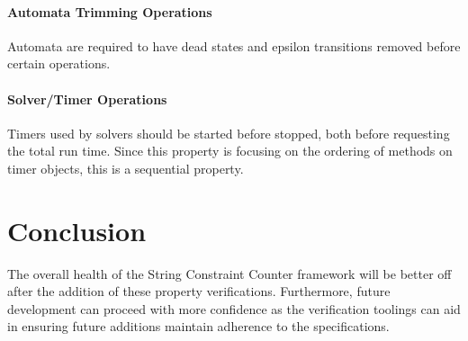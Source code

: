 \documentclass[letterpaper,11pt,twocolumn]{article}
\begin{document}
\paragraph{Automata Trimming Operations} Automata are required to have dead states and epsilon
transitions removed before certain operations.

\paragraph{Solver/Timer Operations} Timers used by solvers should be started before stopped,
both before requesting the total run time.  Since this property is focusing on
the ordering of methods on timer objects, this is a sequential property.

\section{Conclusion}

The overall health of the String Constraint Counter framework will be better
off after the addition of these property verifications.  Furthermore, future
development can proceed with more confidence as the verification toolings can
aid in ensuring future additions maintain adherence to the specifications.

\nocite{*}


\end{document}
